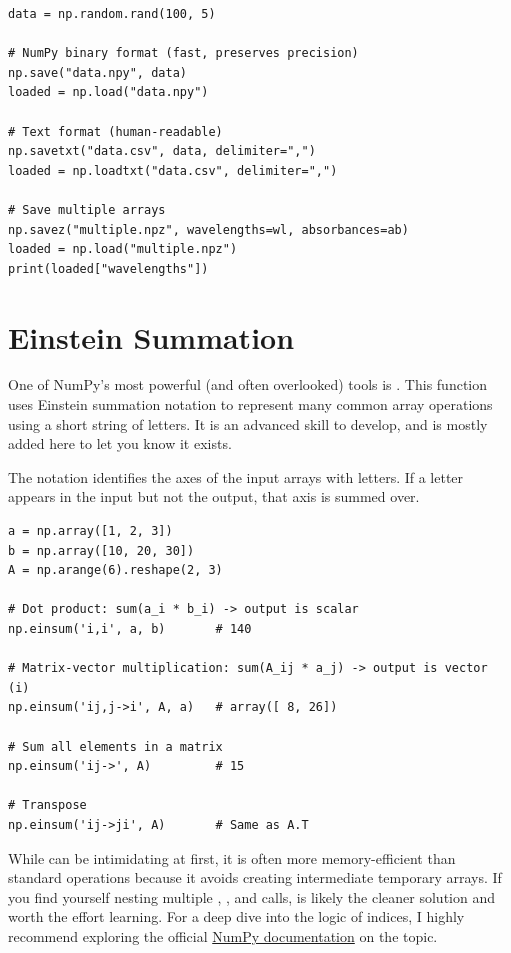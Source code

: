 \begin{lstlisting}
data = np.random.rand(100, 5)

# NumPy binary format (fast, preserves precision)
np.save("data.npy", data)
loaded = np.load("data.npy")

# Text format (human-readable)
np.savetxt("data.csv", data, delimiter=",")
loaded = np.loadtxt("data.csv", delimiter=",")

# Save multiple arrays
np.savez("multiple.npz", wavelengths=wl, absorbances=ab)
loaded = np.load("multiple.npz")
print(loaded["wavelengths"])
\end{lstlisting}
\section{Einstein Summation}
\label{subsec:einsum}

One of NumPy's most powerful (and often overlooked) tools is . This function uses Einstein summation notation to represent many common array operations using a short string of letters. It is an advanced skill to develop, and is mostly added here to let you know it exists.

The notation identifies the axes of the input arrays with letters. If a letter appears in the input but not the output, that axis is summed over.

\begin{lstlisting}
a = np.array([1, 2, 3])
b = np.array([10, 20, 30])
A = np.arange(6).reshape(2, 3)

# Dot product: sum(a_i * b_i) -> output is scalar
np.einsum('i,i', a, b)       # 140

# Matrix-vector multiplication: sum(A_ij * a_j) -> output is vector (i)
np.einsum('ij,j->i', A, a)   # array([ 8, 26])

# Sum all elements in a matrix
np.einsum('ij->', A)         # 15

# Transpose
np.einsum('ij->ji', A)       # Same as A.T
\end{lstlisting}

\begin{tip}
While  can be intimidating at first, it is often more memory-efficient than standard operations because it avoids creating intermediate temporary arrays. If you find yourself nesting multiple , , and  calls,  is likely the cleaner solution and worth the effort learning. For a deep dive into the logic of indices, I highly recommend exploring the official \href{https://numpy.org/doc/stable/reference/generated/numpy.einsum.html}{NumPy documentation} on the topic.
\end{tip}
